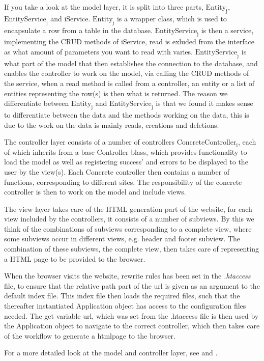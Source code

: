 \begin{description}[style=nextline]
	\item[Model Layer] 
	If you take a look at the model layer, it is split into three parts, $\text{Entity}_\text{j}$, $\text{EntityService}_\text{j}$ and iService.
	$\text{Entity}_\text{j}$ is a wrapper class, which is used to encapsulate a row from a table in the database.
	$\text{EntityService}_\text{j}$ is then a service, implementing the CRUD methods of iService, read is exluded from the interface as what amount of parameters you want to read with varies.
	$\text{EntityService}_\text{j}$ is what part of the model that then establishes the connection to the database, and enables the controller to work on the model, via calling the CRUD methods of the service, when a read method is called from a controller, an entity or a list of entities representing the row(s) is then what is returned.
	The reason we differentiate between  $\text{Entity}_\text{j}$ and $\text{EntityService}_\text{j}$ is that we found it makes sense to differentiate between the data and the methods working on the data, this is due to the work on the data is mainly reads, creations and deletions.
	
	\item[Controller Layer]
	The controller layer consists of a number of controllers $\text{ConcreteController}_\text{i}$, each of which inherits from a base Controller blass, which provides functionality to load the model as well as registering success' and errors to be displayed to the user by the view(s).
	Each Concrete controller then contains a number of functions, corresponding to different sites. The responsibility of the concrete controller is then to work on the model and include views. 
	
	\item[View Layer]
	The view layer takes care of the HTML generation part of the website, for each view included by the controllers, it consists of a number of subviews.
	By this we think of the combinations of subviews corresponding to a complete view, where some subviews occur in different views, e.g. header and footer subview.
	The combination of these subviews, the complete view, then takes care of representing a HTML page to be provided to the browser.
	
	\item[Application]
	When the browser visits the website, rewrite rules has been set in the \textit{.htaccess} file, to ensure that the relative path part of the url is given as an argument to the default index file. This index file then loads the required files, such that the thereafter instantiated Application object has access to the configuration files needed.
	The get variable url, which was set from the .htaccess file is then used by the Application object to navigate to the correct controller, which then takes care of the workflow to generate a htmlpage to the browser.
	
	
\end{description}

For a more detailed look at the model and controller layer, see  and .